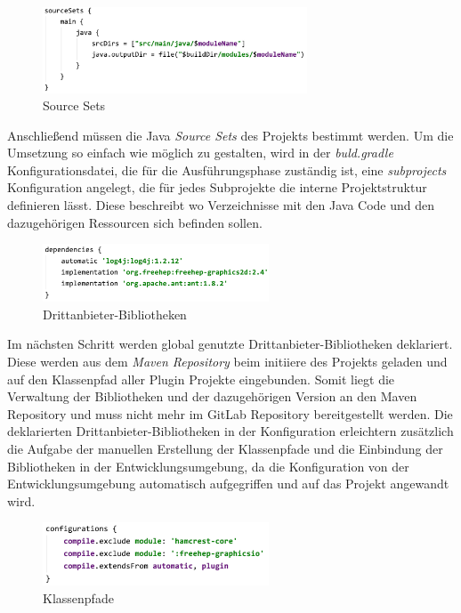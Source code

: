 	\begin{figure}[h!]
	  \centering
	  \includegraphics[width=0.7\textwidth]{material/images/sourceSets.png}
	  \caption{Source Sets}
	  \label{fig:Source_Sets}
	\end{figure}

 	Anschließend müssen die Java \textit{Source Sets} des Projekts bestimmt werden. Um die Umsetzung so einfach wie möglich zu gestalten, wird in der \textit{buld.gradle} Konfigurationsdatei, die für die Ausführungsphase zuständig ist, eine \textit{subprojects} Konfiguration angelegt, die für jedes Subprojekte die interne Projektstruktur definieren lässt. Diese beschreibt wo Verzeichnisse mit den Java Code und den dazugehörigen Ressourcen sich befinden sollen.\bigbreak

	\begin{figure}[h!]
	  \centering
	  \includegraphics[width=0.6\textwidth]{material/images/dep_global.png}
	  \caption{Drittanbieter-Bibliotheken}
	  \label{fig:deps}
	\end{figure}

 	Im nächsten Schritt werden global genutzte Drittanbieter-Bibliotheken deklariert. Diese werden aus dem \textit{Maven Repository} beim initiiere des Projekts geladen und auf den Klassenpfad aller Plugin Projekte eingebunden. Somit liegt die Verwaltung der Bibliotheken und der dazugehörigen Version an den Maven Repository und muss nicht mehr im GitLab Repository bereitgestellt werden. Die deklarierten Drittanbieter-Bibliotheken in der Konfiguration erleichtern zusätzlich die Aufgabe der manuellen Erstellung der Klassenpfade und die Einbindung der Bibliotheken in der Entwicklungsumgebung, da die Konfiguration von der Entwicklungsumgebung automatisch aufgegriffen und auf das Projekt angewandt wird.\newpage

	\begin{figure}[h!]
	  \centering
	  \includegraphics[width=0.6\textwidth]{material/images/configurations.png}
	  \caption{Klassenpfade}
	  \label{fig:kPath}
	\end{figure}

